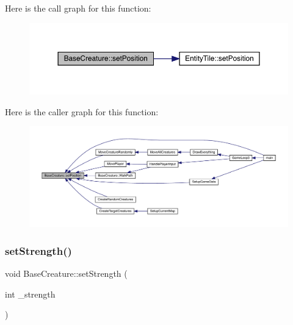 Here is the call graph for this function\+:
\nopagebreak
\begin{figure}[H]
\begin{center}
\leavevmode
\includegraphics[width=350pt]{d2/d3b/class_base_creature_a00ffc1ee732a8f0a8921c9cee6842e4d_cgraph}
\end{center}
\end{figure}
Here is the caller graph for this function\+:
\nopagebreak
\begin{figure}[H]
\begin{center}
\leavevmode
\includegraphics[width=350pt]{d2/d3b/class_base_creature_a00ffc1ee732a8f0a8921c9cee6842e4d_icgraph}
\end{center}
\end{figure}
\mbox{\label{class_base_creature_a3a2eb318b9c5d849a02884b20e32f83d}} 
\subsubsection{\texorpdfstring{set\+Strength()}{setStrength()}}
{\footnotesize\ttfamily void Base\+Creature\+::set\+Strength (\begin{DoxyParamCaption}\item[{int}]{\+\_\+strength }\end{DoxyParamCaption})}


